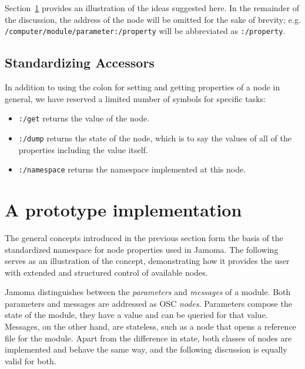 \documentclass{NIME-alternate}
\begin{document}
Section~\ref{sec:prototype_implementation} provides an illustration of the ideas suggested here. In the remainder of the discussion, the address of the node will be omitted for the sake of brevity; e.g.\\ 
\texttt{/computer/module/parameter:/property}  
will be abbreviated as \texttt{:/property}.



\subsection{Standardizing Accessors}

In addition to using the colon for setting and getting properties of a node in general, we have reserved a limited number of symbols for specific tasks:
\begin{itemize}
	\item \texttt{:/get} returns the value of the node.
	\item \texttt{:/dump} returns the state of the node, which is to say the values of all of the properties including the value itself.
	\item \texttt{:/namespace} returns the namespace implemented at this node.
\end{itemize}






\section{A prototype implementation} %
\label{sec:prototype_implementation}

The general concepts introduced in the previous section form the basis of the standardized namespace for node properties used in Jamoma. The following serves as an illustration of the concept, demonstrating how it provides the user with extended and structured control of available nodes.

Jamoma distinguishes between the \emph{parameters} and \emph{messages} of a module.  Both parameters and messages are addressed as OSC \emph{nodes}.  Parameters compose the state of the module, they have a value and can be queried for that value. Messages, on the other hand, are stateless, such as a node that opens a reference file for the module. Apart from the difference in state, both classes of nodes are implemented and behave the same way, and the following discussion is equally valid for both. 
\end{document}
